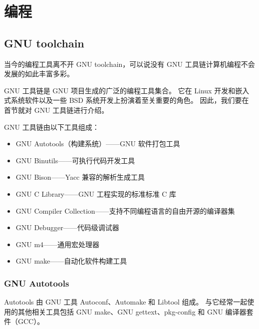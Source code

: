\chapter{编程}

\section{GNU toolchain}

当今的编程工具离不开 GNU toolchain，可以说没有 GNU 工具链计算机编程不会发展的如此丰富多彩。

GNU 工具链是 GNU 项目生成的广泛的编程工具集合。
它在 Linux 开发和嵌入式系统软件以及一些 BSD 系统开发上扮演着至关重要的角色。
因此，我们要在首节就对 GNU 工具链进行介绍。

GNU 工具链由以下工具组成：

\begin{itemize}
  \item GNU Autotools（构建系统）——GNU 软件打包工具
  \item GNU Binutils——可执行代码开发工具
  \item GNU Bison——Yacc 兼容的解析生成工具
  \item GNU C Library——GNU 工程实现的标准标准 C 库
  \item GNU Compiler Collection——支持不同编程语言的自由开源的编译器集
  \item GNU Debugger——代码级调试器
  \item GNU m4——通用宏处理器
  \item GNU make——自动化软件构建工具
\end{itemize}

\subsection{GNU Autotools}

Autotools 由 GNU 工具 Autoconf、Automake 和 Libtool 组成。
与它经常一起使用的其他相关工具包括 GNU make、GNU gettext、pkg-config 和 GNU 编译器套件（GCC）。

